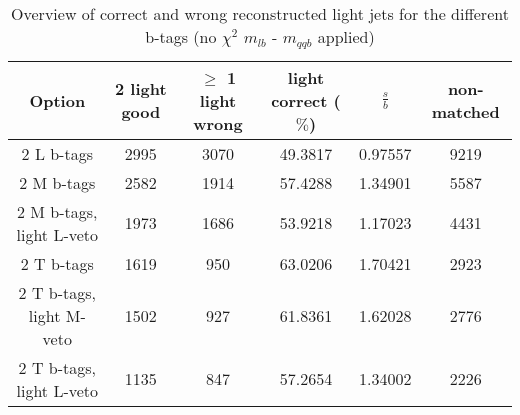 \begin{table}[!h] 
 \begin{tabular}{c|c|c|c|c|c} 
  \textbf{Option} & 2 light good  & $\geq$ 1 light wrong & light correct ($\%$) & $\frac{s}{b}$ & non-matched \\ \hline 
  2 L b-tags              & 2995 & 3070 & 49.3817 & 0.97557 & 9219\\ 
  2 M b-tags              & 2582 & 1914 & 57.4288 & 1.34901 & 5587\\ 
  2 M b-tags, light L-veto & 1973 & 1686 & 53.9218 & 1.17023 & 4431\\ 
  2 T b-tags              & 1619 & 950 & 63.0206 & 1.70421 & 2923\\ 
  2 T b-tags, light M-veto & 1502 & 927 & 61.8361 & 1.62028 & 2776\\ 
  2 T b-tags, light L-veto & 1135 & 847 & 57.2654 & 1.34002 & 2226\\ 
 \end{tabular} 
 \caption{Overview of correct and wrong reconstructed light jets for the different b-tags (no $\chi^{2}$ $m_{lb}$ - $m_{qqb}$ applied)}
\end{table} 
 
